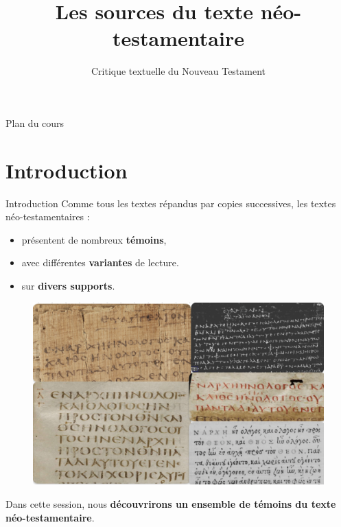 \documentclass[11pt]{beamer}
\begin{document}
\title{Les sources du texte néo-testamentaire}
\subtitle{Critique textuelle du Nouveau Testament}

\begin{frame}{}
    \titlepage
\end{frame}

\begin{frame}{Plan du cours}
\tableofcontents
\end{frame}

\section{Introduction}

\begin{frame}{Introduction}
    Comme tous les textes répandus par copies successives, les textes néo-testamentaires :
    \begin{itemize}
        \item présentent de nombreux \textbf{témoins},
        \item avec différentes \textbf{variantes} de lecture.
        \item sur \textbf{divers supports}.
    \end{itemize}
     \pause
     \begin{figure}
         \centering
         \includegraphics[width=0.5\linewidth]{img/divers_jn_1_1.png}
     \end{figure}
    \vfill
    \pause
    \begin{block}{}
        Dans cette session, nous \textbf{découvrirons un ensemble de témoins du texte néo-testamentaire}.
    \end{block}
\end{frame}
\end{document}
